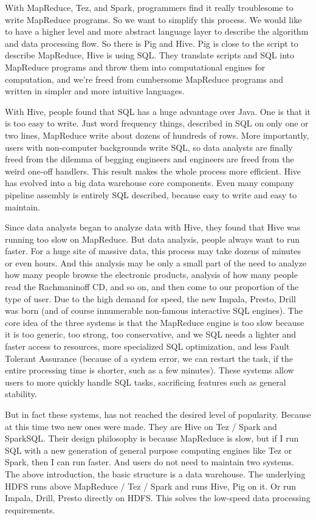 \documentclass[sigconf]{acmart}
\begin{document}
\par With MapReduce, Tez, and Spark, programmers find it really troublesome to write MapReduce programs. So we want to simplify this process. We would like to have a higher level and more abstract language layer to describe the algorithm and data processing flow. So there is Pig and Hive. Pig is close to the script to describe MapReduce, Hive is using SQL. They translate scripts and SQL into MapReduce programs and throw them into computational engines for computation, and we're freed from cumbersome MapReduce programs and written in simpler and more intuitive languages.

\par With Hive, people found that SQL has a huge advantage over Java. One is that it is too easy to write. Just word frequency things, described in SQL on only one or two lines, MapReduce write about dozens of hundreds of rows. More importantly, users with non-computer backgrounds write SQL, so data analysts are finally freed from the dilemma of begging engineers and engineers are freed from the weird one-off handlers. This result makes the whole process more efficient. Hive has evolved into a big data warehouse core components. Even many company pipeline assembly is entirely SQL described, because easy to write and easy to maintain.

\par Since data analysts began to analyze data with Hive, they found that Hive was running too slow on MapReduce. But data analysis, people always want to run faster. For a huge site of massive data, this process may take dozens of minutes or even hours. And this analysis may be only a small part of the need to analyze how many people browse the electronic products, analysis of how many people read the Rachmaninoff CD, and so on, and then come to our proportion of the type of user. Due to the high demand for speed, the new Impala, Presto, Drill was born (and of course innumerable non-famous interactive SQL engines). The core idea of ​​the three systems is that the MapReduce engine is too slow because it is too generic, too strong, too conservative, and we SQL needs a lighter and faster access to resources, more specialized SQL optimization, and less Fault Tolerant Assurance (because of a system error, we can restart the task, if the entire processing time is shorter, such as a few minutes). These systems allow users to more quickly handle SQL tasks, sacrificing features such as general stability.

\par But in fact these systems, has not reached the desired level of popularity. Because at this time two new ones were made. They are Hive on Tez / Spark and SparkSQL. Their design philosophy is because MapReduce is slow, but if I run SQL with a new generation of general purpose computing engines like Tez or Spark, then I can run faster. And users do not need to maintain two systems. The above introduction, the basic structure is a data warehouse. The underlying HDFS runs above MapReduce / Tez / Spark and runs Hive, Pig on it. Or run Impala, Drill, Presto directly on HDFS. This solves the low-speed data processing requirements.
\end{document}
